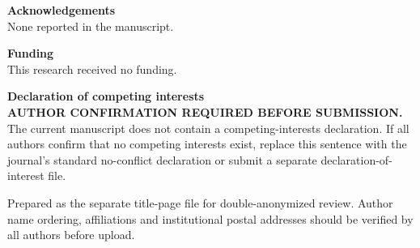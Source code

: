 \documentclass[12pt]{article}
\begin{document}
\textbf{Acknowledgements}\\
None reported in the manuscript.

\textbf{Funding}\\
This research received no funding.

\textbf{Declaration of competing interests}\\
\textbf{AUTHOR CONFIRMATION REQUIRED BEFORE SUBMISSION.} The current manuscript does not contain a competing-interests declaration. If all authors confirm that no competing interests exist, replace this sentence with the journal's standard no-conflict declaration or submit a separate declaration-of-interest file.

\vfill
\small Prepared as the separate title-page file for double-anonymized review. Author name ordering, affiliations and institutional postal addresses should be verified by all authors before upload.
\end{document}

